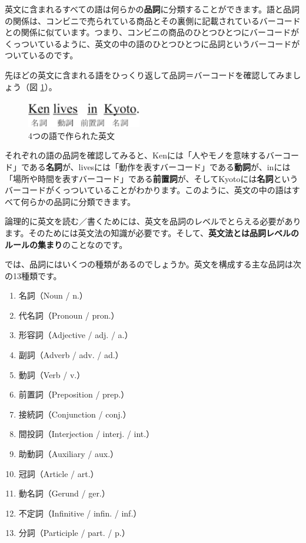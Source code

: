 \documentclass[titlepage]{jsarticle}
\begin{document}
英文に含まれるすべての語は何らかの{\bf 品詞}に分類することができます。語と品詞の関係は、コンビニで売られている商品とその裏側に記載されているバーコードとの関係に似ています。つまり、コンビニの商品のひとつひとつにバーコードがくっついているように、英文の中の語のひとつひとつに品詞というバーコードがついているのです。

先ほどの英文に含まれる語をひっくり返して品詞＝バーコードを確認してみましょう（図 \ref{fig2}）。

 \begin{figure}[htbp]
  \begin{center}
   \includegraphics[width=5cm]{./figure/fig2.pdf}
   \caption{4つの語で作られた英文}
   \label{fig2}
  \end{center}
 \end{figure}


それぞれの語の品詞を確認してみると、Kenには「人やモノを意味するバーコード」である{\bf 名詞}が、livesには「動作を表すバーコード」である{\bf 動詞}が、inには「場所や時間を表すバーコード」である{\bf 前置詞}が、そしてKyotoには{\bf 名詞}というバーコードがくっついていることがわかります。このように、英文の中の語はすべて何らかの品詞に分類できます。

論理的に英文を読む／書くためには、英文を品詞のレベルでとらえる必要があります。そのためには英文法の知識が必要です。そして、{\bf 英文法とは品詞レベルのルールの集まり}のことなのです。

では、品詞にはいくつの種類があるのでしょうか。英文を構成する主な品詞は次の13種類です。
\begin{enumerate}
\item 名詞（Noun / n.）
\item 代名詞（Pronoun / pron.）
\item 形容詞（Adjective / adj. / a.）
\item 副詞（Adverb / adv. / ad.）
\item 動詞（Verb / v.）
\item 前置詞（Preposition / prep.）
\item 接続詞（Conjunction / conj.）
\item 間投詞（Interjection / interj. / int.）
\item 助動詞（Auxiliary / aux.）
\item 冠詞（Article / art.）
\item 動名詞（Gerund / ger.）
\item 不定詞（Infinitive / infin. / inf.）
\item 分詞（Participle / part. / p.）
\end{enumerate}
\end{document}
